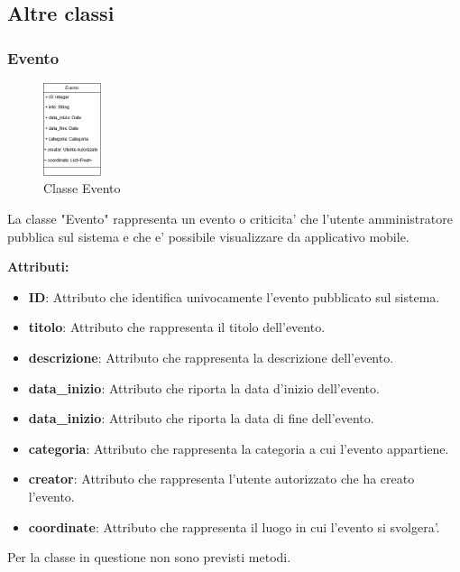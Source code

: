 \documentclass{article}
\begin{document}
\clearpage

\subsection{Altre classi}

\subsubsection{Evento}

\begin{figure}[htbp]
    \centering
    \includegraphics[width=0.15\textwidth]{Images/evento_class.png}
    \caption{Classe Evento}
    \label{fig:evento}
\end{figure}

La classe "Evento" rappresenta un evento o criticita' che l'utente amministratore pubblica sul sistema e che e' possibile visualizzare da applicativo mobile.

\textbf{Attributi:}\\
\begin{itemize}
    \item \textbf{ID}: Attributo che identifica univocamente l'evento pubblicato sul sistema.
    \item \textbf{titolo}: Attributo che rappresenta il titolo dell'evento.
    \item \textbf{descrizione}: Attributo che rappresenta la descrizione dell'evento.
    \item \textbf{data\_inizio}: Attributo che riporta la data d'inizio dell'evento.
    \item \textbf{data\_inizio}: Attributo che riporta la data di fine dell'evento.
    \item \textbf{categoria}: Attributo che rappresenta la categoria a cui l'evento appartiene.
    \item \textbf{creator}: Attributo che rappresenta l'utente autorizzato che ha creato l'evento.
    \item \textbf{coordinate}: Attributo che rappresenta il luogo in cui l'evento si svolgera'.\\
\end{itemize}
Per la classe in questione non sono previsti metodi.
\end{document}
